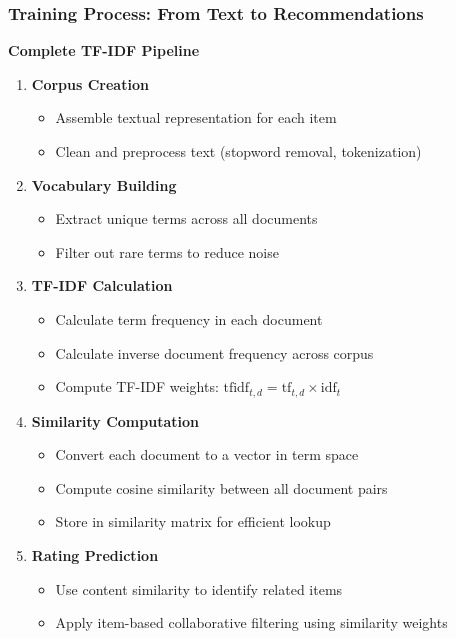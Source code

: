 \documentclass{beamer}
\begin{document}
\begin{frame}
\frametitle{Training Process: From Text to Recommendations}
\textbf{Complete TF-IDF Pipeline}
\begin{enumerate}
    \item \textbf{Corpus Creation}
    \begin{itemize}
        \item Assemble textual representation for each item
        \item Clean and preprocess text (stopword removal, tokenization)
    \end{itemize}
    
    \item \textbf{Vocabulary Building}
    \begin{itemize}
        \item Extract unique terms across all documents
        \item Filter out rare terms to reduce noise
    \end{itemize}
    
    \item \textbf{TF-IDF Calculation}
    \begin{itemize}
        \item Calculate term frequency in each document
        \item Calculate inverse document frequency across corpus
        \item Compute TF-IDF weights: $\text{tfidf}_{t,d} = \text{tf}_{t,d} \times \text{idf}_t$
    \end{itemize}
    
    \item \textbf{Similarity Computation}
    \begin{itemize}
        \item Convert each document to a vector in term space
        \item Compute cosine similarity between all document pairs
        \item Store in similarity matrix for efficient lookup
    \end{itemize}
    
    \item \textbf{Rating Prediction}
    \begin{itemize}
        \item Use content similarity to identify related items
        \item Apply item-based collaborative filtering using similarity weights
    \end{itemize}
\end{enumerate}
\end{frame}
\end{document}
